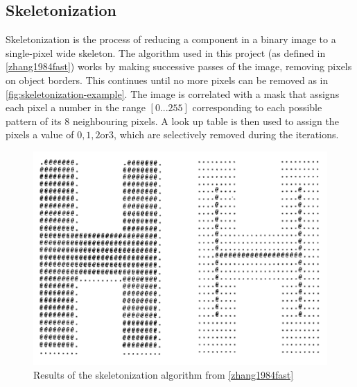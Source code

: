 
\subsection{Skeletonization}
\label{sec:skeletonization}

Skeletonization is the process of reducing a component in a binary image to a single-pixel wide skeleton. The algorithm used in this project (as defined in \cref{zhang1984fast}) works by making successive passes of the image, removing pixels on object borders. This continues until no more pixels can be removed as in \cref{fig:skeletonization-example}.  The image is correlated with a mask that assigns each pixel a number in the range $[0...255]$ corresponding to each possible pattern of its $8$ neighbouring pixels. A look up table is then used to assign the pixels a value of $0, 1, 2 \text{or} 3$, which are selectively removed during the iterations.

\begin{figure}[H]
  \includegraphics{gfx/skeletonization.png}
  \caption{Results of the skeletonization algorithm from \cref{zhang1984fast}}
\end{figure}




